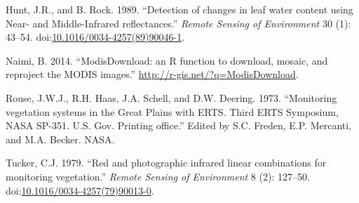 \documentclass[]{article}
\begin{document}
\hypertarget{ref-HUNTJR1989}{}
Hunt, J.R., and B. Rock. 1989. ``Detection of changes in leaf water
content using Near- and Middle-Infrared reflectances.'' \emph{Remote
Sensing of Environment} 30 (1): 43--54.
doi:\href{https://doi.org/10.1016/0034-4257(89)90046-1}{10.1016/0034-4257(89)90046-1}.

\hypertarget{ref-Naimi2014}{}
Naimi, B. 2014. ``ModisDownload: an R function to download, mosaic, and
reproject the MODIS images.'' \url{http://r-gis.net/?q=ModisDownload}.

\hypertarget{ref-Rouse1973}{}
Rouse, J.W.J., R.H. Haas, J.A. Schell, and D.W. Deering. 1973.
``Monitoring vegetation systems in the Great Plains with ERTS. Third
ERTS Symposium, NASA SP-351. U.S. Gov. Printing office.'' Edited by S.C.
Freden, E.P. Mercanti, and M.A. Becker. NASA.

\hypertarget{ref-Tucker1979}{}
Tucker, C.J. 1979. ``Red and photographic infrared linear combinations
for monitoring vegetation.'' \emph{Remote Sensing of Environment} 8 (2):
127--50.
doi:\href{https://doi.org/10.1016/0034-4257(79)90013-0}{10.1016/0034-4257(79)90013-0}.
\end{document}
